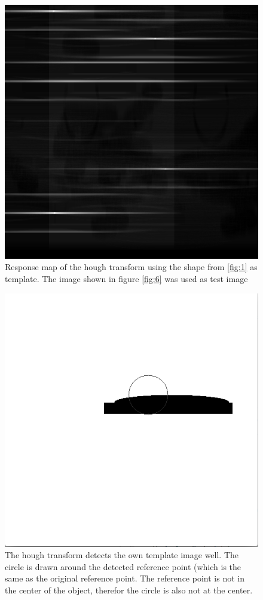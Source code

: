\documentclass[11pt,a4paper]{article}
\begin{document}
\begin{figure}
\centering
\includegraphics[scale=.4]{img/mapShape.png}

\caption{Response map of the hough transform using the shape from \ref{fig:1} as template. The image shown in figure \ref{fig:6} was used as test image}
\label{fig:4}
\end{figure}


\begin{figure}
\centering
\includegraphics[scale=.4]{img/matchTemplate.png}

\caption{The hough transform detects the own template image well. The circle is drawn around the detected reference point (which is the same as the original reference point. The reference point is not in the center of the object, therefor the circle is also not at the center.  }
\label{fig:5}
\end{figure}
\end{document}
